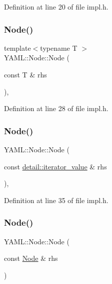 Definition at line 20 of file impl.\+h.

\mbox{\label{class_y_a_m_l_1_1_node_a8ca3b8da61f7f85a7a3424893951bb1c}} 
\subsubsection{\texorpdfstring{Node()}{Node()}\hspace{0.1cm}{\footnotesize\ttfamily [3/5]}}
{\footnotesize\ttfamily template$<$typename T $>$ \\
Y\+A\+M\+L\+::\+Node\+::\+Node (\begin{DoxyParamCaption}\item[{const T \&}]{rhs }\end{DoxyParamCaption})\hspace{0.3cm}{\ttfamily [inline]}, {\ttfamily [explicit]}}



Definition at line 28 of file impl.\+h.

\mbox{\label{class_y_a_m_l_1_1_node_a73644c0a70230a2400636e4bc0e1f061}} 
\subsubsection{\texorpdfstring{Node()}{Node()}\hspace{0.1cm}{\footnotesize\ttfamily [4/5]}}
{\footnotesize\ttfamily Y\+A\+M\+L\+::\+Node\+::\+Node (\begin{DoxyParamCaption}\item[{const \mbox{\hyperlink{struct_y_a_m_l_1_1detail_1_1iterator__value}{detail\+::iterator\+\_\+value}} \&}]{rhs }\end{DoxyParamCaption})\hspace{0.3cm}{\ttfamily [inline]}, {\ttfamily [explicit]}}



Definition at line 35 of file impl.\+h.

\mbox{\label{class_y_a_m_l_1_1_node_af6e3fe8af7e9da72d9c6484b0370d533}} 
\subsubsection{\texorpdfstring{Node()}{Node()}\hspace{0.1cm}{\footnotesize\ttfamily [5/5]}}
{\footnotesize\ttfamily Y\+A\+M\+L\+::\+Node\+::\+Node (\begin{DoxyParamCaption}\item[{const \mbox{\hyperlink{class_y_a_m_l_1_1_node}{Node}} \&}]{rhs }\end{DoxyParamCaption})\hspace{0.3cm}{\ttfamily [inline]}}




